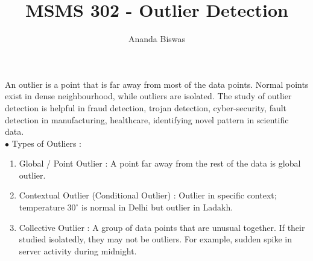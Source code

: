 \documentclass[11pt, a4paper]{article}
\title{MSMS 302 - Outlier Detection}
\author{Ananda Biswas}
\date{}
\begin{document}
\maketitle

An outlier is a point that is far away from most of the data points. Normal points exist in dense neighbourhood, while outliers are isolated. The study of outlier detection is helpful in fraud detection, trojan detection, cyber-security, fault detection in manufacturing, healthcare, identifying novel pattern in scientific data.\\[0.5em]

$\bullet$ Types of Outliers :
\begin{enumerate}
\item Global / Point Outlier : A point far away from the rest of the data is global outlier.
\item Contextual Outlier (Conditional Outlier) : Outlier in specific context; temperature $30^{\circ}$ is normal in Delhi but outlier in Ladakh.
\item Collective Outlier : A group of data points that are unusual together. If their studied isolatedly, they may not be outliers. For example, sudden spike in server activity during midnight.
\end{enumerate}
\end{document}
